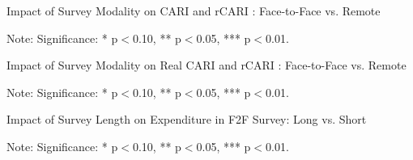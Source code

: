\documentclass[11pt,harvard]{article}
\begin{document}
	
	\begin{table}[htbp]
		\centering
		\begin{adjustbox}{max width=\textwidth}
			\begin{threeparttable}
				\caption{Impact of Survey Modality on CARI and rCARI : Face-to-Face vs. Remote}
				\scriptsize
				 
				\label{tab:Ecuador_CARI_Modality_Balance}
				\begin{tablenotes}
					\item Note: Significance: * p$<$0.10, ** p$<$0.05, *** p$<$0.01. 
				\end{tablenotes}
			\end{threeparttable}
		\end{adjustbox}
	\end{table}
	
	\begin{table}[htbp]
		\centering
		\begin{adjustbox}{max width=\textwidth}
			\begin{threeparttable}
				\caption{Impact of Survey Modality on Real CARI and rCARI : Face-to-Face vs. Remote}
				\scriptsize
				 
				\label{tab:Ecuador_CARI_Modality_Balance_Key}
				\begin{tablenotes}
					\item Note: Significance: * p$<$0.10, ** p$<$0.05, *** p$<$0.01. 
				\end{tablenotes}
			\end{threeparttable}
		\end{adjustbox}
	\end{table}
	
	\begin{table}[htbp]
		\centering
		\begin{adjustbox}{max width=\textwidth}
			\begin{threeparttable}
				\caption{Impact of Survey Length on Expenditure in F2F Survey: Long vs. Short}
				\scriptsize
				 
				\label{tab:Ecuador_FES_F2F_Length_Balance}
				\begin{tablenotes}
					\item Note: Significance: * p$<$0.10, ** p$<$0.05, *** p$<$0.01. 
				\end{tablenotes}
			\end{threeparttable}
		\end{adjustbox}
	\end{table}
	
\end{document}
